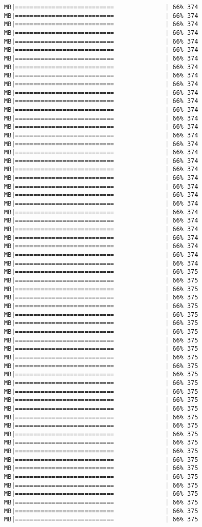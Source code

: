 \documentclass[
]{article}
\begin{document}
\begin{verbatim}
MB|===========================              | 66% 374 MB|===========================              | 66% 374 MB|===========================              | 66% 374 MB|===========================              | 66% 374 MB|===========================              | 66% 374 MB|===========================              | 66% 374 MB|===========================              | 66% 374 MB|===========================              | 66% 374 MB|===========================              | 66% 374 MB|===========================              | 66% 374 MB|===========================              | 66% 374 MB|===========================              | 66% 374 MB|===========================              | 66% 374 MB|===========================              | 66% 374 MB|===========================              | 66% 374 MB|===========================              | 66% 374 MB|===========================              | 66% 374 MB|===========================              | 66% 374 MB|===========================              | 66% 374 MB|===========================              | 66% 374 MB|===========================              | 66% 374 MB|===========================              | 66% 374 MB|===========================              | 66% 374 MB|===========================              | 66% 374 MB|===========================              | 66% 374 MB|===========================              | 66% 374 MB|===========================              | 66% 374 MB|===========================              | 66% 374 MB|===========================              | 66% 374 MB|===========================              | 66% 374 MB|===========================              | 66% 374 MB|===========================              | 66% 375 MB|===========================              | 66% 375 MB|===========================              | 66% 375 MB|===========================              | 66% 375 MB|===========================              | 66% 375 MB|===========================              | 66% 375 MB|===========================              | 66% 375 MB|===========================              | 66% 375 MB|===========================              | 66% 375 MB|===========================              | 66% 375 MB|===========================              | 66% 375 MB|===========================              | 66% 375 MB|===========================              | 66% 375 MB|===========================              | 66% 375 MB|===========================              | 66% 375 MB|===========================              | 66% 375 MB|===========================              | 66% 375 MB|===========================              | 66% 375 MB|===========================              | 66% 375 MB|===========================              | 66% 375 MB|===========================              | 66% 375 MB|===========================              | 66% 375 MB|===========================              | 66% 375 MB|===========================              | 66% 375 MB|===========================              | 66% 375 MB|===========================              | 66% 375 MB|===========================              | 66% 375 MB|===========================              | 66% 375 MB|===========================              | 66% 375 MB|===========================              | 66% 375 
\end{verbatim}
\end{document}
